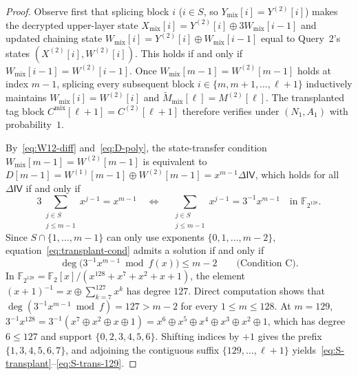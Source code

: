 \documentclass[11pt,a4paper]{article}
\theoremstyle{definition}
\theoremstyle{remark}
\newcommand{\Ftwo}{\mathbb{F}_2}
\newcommand{\FtwoN}{\mathbb{F}_{2^{128}}}
\newcommand{\IV}{\mathsf{IV}}
\begin{document}
\begin{proof}
Observe first that splicing block $i$ ($i \in S$, so $Y_{\mathrm{mix}}[i] = Y^{(2)}[i]$) makes the decrypted upper-layer state $X_{\mathrm{mix}}[i] = Y^{(2)}[i] \oplus 3W_{\mathrm{mix}}[i-1]$ and updated chaining state $W_{\mathrm{mix}}[i] = Y^{(2)}[i] \oplus W_{\mathrm{mix}}[i-1]$ equal to Query~2's states $(X^{(2)}[i], W^{(2)}[i])$. This holds if and only if $W_{\mathrm{mix}}[i-1] = W^{(2)}[i-1]$. Once $W_{\mathrm{mix}}[m-1] = W^{(2)}[m-1]$ holds at index $m - 1$, splicing every subsequent block $i \in \{m, m + 1, \dots, \ell + 1\}$ inductively maintains $W_{\mathrm{mix}}[i] = W^{(2)}[i]$ and $\tilde{M}_{\mathrm{mix}}[\ell] = M^{(2)}[\ell]$. The transplanted tag block $C^{\mathrm{mix}}[\ell + 1] = C^{(2)}[\ell + 1]$ therefore verifies under $(N_1, A_1)$ with probability~$1$.

By~\eqref{eq:W12-diff} and~\eqref{eq:D-poly}, the state-transfer condition $W_{\mathrm{mix}}[m-1] = W^{(2)}[m-1]$ is equivalent to $D[m-1] = W^{(1)}[m-1] \oplus W^{(2)}[m-1] = x^{m-1} \Delta\IV$, which holds for all $\Delta\IV$ if and only if
\begin{equation}
\label{eq:transplant-cond}
3 \sum_{\substack{j \in S \\ j \le m - 1}} x^{j-1} = x^{m-1} \quad \Longleftrightarrow \quad \sum_{\substack{j \in S \\ j \le m - 1}} x^{j-1} = 3^{-1} x^{m-1} \quad \text{in } \FtwoN.
\end{equation}
Since $S \cap \{1, \dots, m - 1\}$ can only use exponents $\{0, 1, \dots, m - 2\}$, equation~\eqref{eq:transplant-cond} admits a solution if and only if
\begin{equation}
\label{eq:cond-C}
\deg\big(3^{-1} x^{m-1} \bmod f(x)\big) \le m - 2 \qquad \text{(Condition~C)}.
\end{equation}
In $\FtwoN = \Ftwo[x]/(x^{128} + x^7 + x^2 + x + 1)$, the element $(x + 1)^{-1} = x \oplus \sum_{k=7}^{127} x^k$ has degree $127$. Direct computation shows that $\deg(3^{-1} x^{m-1} \bmod f) = 127 > m - 2$ for every $1 \le m \le 128$. At $m = 129$, $3^{-1} x^{128} = 3^{-1}(x^7 \oplus x^2 \oplus x \oplus 1) = x^6 \oplus x^5 \oplus x^4 \oplus x^3 \oplus x^2 \oplus 1$, which has degree $6 \le 127$ and support $\{0, 2, 3, 4, 5, 6\}$. Shifting indices by $+1$ gives the prefix $\{1, 3, 4, 5, 6, 7\}$, and adjoining the contiguous suffix $\{129, \dots, \ell+1\}$ yields~\eqref{eq:S-transplant}--\eqref{eq:S-trans-129}.
\end{proof}
\end{document}
